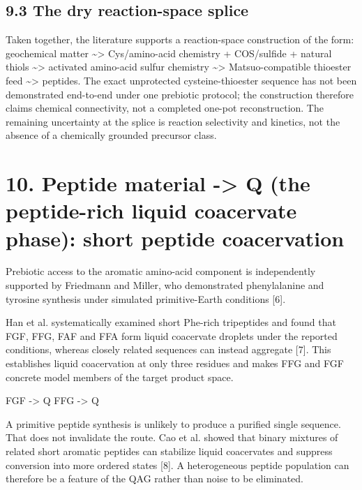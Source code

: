 \documentclass[11pt]{article}
\begin{document}
\hypertarget{the-dry-reaction-space-splice}{%
\subsection*{9.3 The dry reaction-space splice}\label{the-dry-reaction-space-splice}}

Taken together, the literature supports a reaction-space construction of the form: geochemical matter \textasciitilde\textgreater{} Cys/amino-acid chemistry + COS/sulfide + natural thiols \textasciitilde\textgreater{} activated amino-acid sulfur chemistry \textasciitilde\textgreater{} Matsuo-compatible thioester feed \textasciitilde\textgreater{} peptides. The exact unprotected cysteine-thioester sequence has not been demonstrated end-to-end under one prebiotic protocol; the construction therefore claims chemical connectivity, not a completed one-pot reconstruction. The remaining uncertainty at the splice is reaction selectivity and kinetics, not the absence of a chemically grounded precursor class.

\hypertarget{peptide-material---q-short-peptide-coacervation}{%
\section*{10. Peptide material -\textgreater{} Q (the peptide-rich liquid coacervate phase): short peptide coacervation}\label{peptide-material---q-short-peptide-coacervation}}

Prebiotic access to the aromatic amino-acid component is independently supported by Friedmann and Miller, who demonstrated phenylalanine and tyrosine synthesis under simulated primitive-Earth conditions {[}6{]}.

Han et al. systematically examined short Phe-rich tripeptides and found that FGF, FFG, FAF and FFA form liquid coacervate droplets under the reported conditions, whereas closely related sequences can instead aggregate {[}7{]}. This establishes liquid coacervation at only three residues and makes FFG and FGF concrete model members of the target product space.

FGF -\textgreater{} Q FFG -\textgreater{} Q

A primitive peptide synthesis is unlikely to produce a purified single sequence. That does not invalidate the route. Cao et al. showed that binary mixtures of related short aromatic peptides can stabilize liquid coacervates and suppress conversion into more ordered states {[}8{]}. A heterogeneous peptide population can therefore be a feature of the QAG rather than noise to be eliminated.
\end{document}
